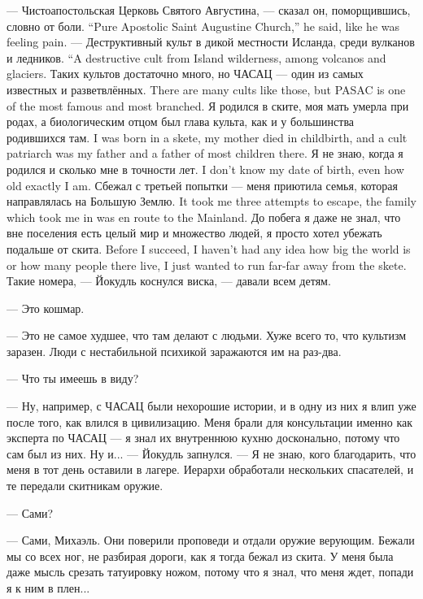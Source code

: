 {--- Чистоапостольская Церковь Святого Августина, --- сказал он, поморщившись, словно от боли.}
{``Pure Apostolic Saint Augustine Church,'' he said, like he was feeling pain.}
{--- Деструктивный культ в дикой местности Исланда, среди вулканов и ледников.}
{``A destructive cult from Island wilderness, among volcanos and glaciers.}
{Таких культов достаточно много, но ЧАСАЦ --- один из самых известных и разветвлённых.}
{There are many cults like those, but PASAC is one of the most famous and most branched.}
{Я родился в ските, моя мать умерла при родах, а биологическим отцом был глава культа, как и у большинства родившихся там.}
{I was born in a skete, my mother died in childbirth, and a cult patriarch was my father and a father of most children there.}
{Я не знаю, когда я родился и сколько мне в точности лет.}
{I don't know my date of birth, even how old exactly I am.}
{Сбежал с третьей попытки --- меня приютила семья, которая направлялась на Большую Землю.}
{It took me three attempts to escape, the family which took me in was en route to the Mainland.}
{До побега я даже не знал, что вне поселения есть целый мир и множество людей, я просто хотел убежать подальше от скита.}
{Before I succeed, I haven't had any idea how big the world is or how many people there live, I just wanted to run far-far away from the skete.}
Такие номера, --- Йокудль коснулся виска, --- давали всем детям.

--- Это кошмар.

--- Это не самое худшее, что там делают с людьми.
Хуже всего то, что культизм заразен.
Люди с нестабильной психикой заражаются им на раз-два.

--- Что ты имеешь в виду?

--- Ну, например, с ЧАСАЦ были нехорошие истории, и в одну из них я влип уже после того, как влился в цивилизацию.
Меня брали для консультации именно как эксперта по ЧАСАЦ --- я знал их внутреннюю кухню досконально, потому что сам был из них.
Ну и... --- Йокудль запнулся.
--- Я не знаю, кого благодарить, что меня в тот день оставили в лагере.
Иерархи обработали нескольких спасателей, и те передали скитникам оружие.

--- Сами?

--- Сами, Михаэль.
Они поверили проповеди и отдали оружие верующим.
Бежали мы со всех ног, не разбирая дороги, как я тогда бежал из скита.
У меня была даже мысль срезать татуировку ножом, потому что я знал, что меня ждет, попади я к ним в плен...

